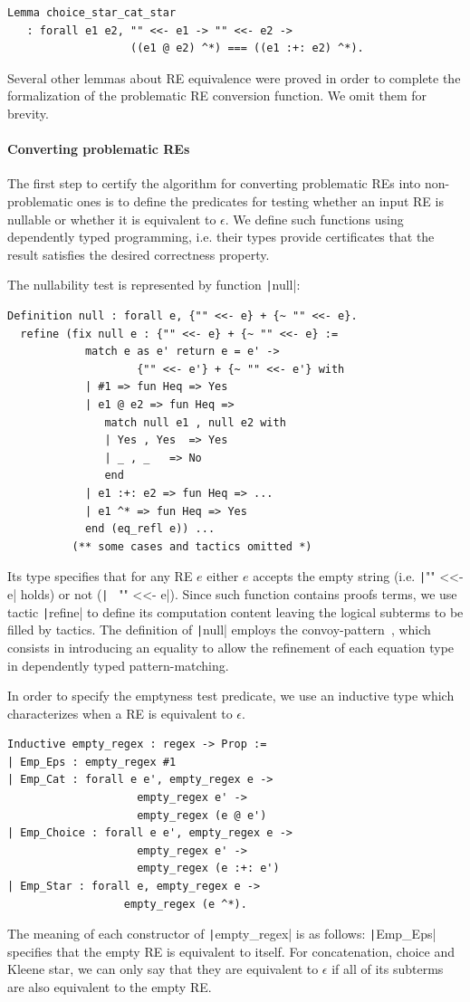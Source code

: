\documentclass[review]{elsarticle}
\newcommand{\coq}[1]{\texttt|#1|}
\theoremstyle{definition}
\begin{document}
\begin{verbatim}
Lemma choice_star_cat_star 
   : forall e1 e2, "" <<- e1 -> "" <<- e2 ->
                   ((e1 @ e2) ^*) === ((e1 :+: e2) ^*). 

\end{verbatim}
Several other lemmas about RE equivalence were proved in order to complete
the formalization of the problematic RE conversion function. We omit them
for brevity.

\paragraph{Converting problematic REs} The first step to certify the algorithm
for converting problematic REs into non-problematic ones is to define the
predicates for testing whether an input RE is nullable or whether it is equivalent to
$\epsilon$. We define such functions using dependently typed programming, i.e.
their types provide certificates that the result satisfies the desired correctness
property.

The nullability test is represented by function \coq{null}:
\begin{verbatim}
Definition null : forall e, {"" <<- e} + {~ "" <<- e}.
  refine (fix null e : {"" <<- e} + {~ "" <<- e} :=
            match e as e' return e = e' -> 
                    {"" <<- e'} + {~ "" <<- e'} with
            | #1 => fun Heq => Yes
            | e1 @ e2 => fun Heq =>
               match null e1 , null e2 with
               | Yes , Yes  => Yes
               | _ , _   => No
               end 
            | e1 :+: e2 => fun Heq => ...
            | e1 ^* => fun Heq => Yes
            end (eq_refl e)) ...
          (** some cases and tactics omitted *)
\end{verbatim}
Its type specifies that for any RE $e$ either $e$ accepts the empty string (i.e.
\coq{"" <<- e} holds) or not (\coq{~ "" <<- e}). Since such function contains
proofs terms, we use tactic \coq{refine} to define its computation content
leaving the logical subterms to be filled by tactics. The definition of
\coq{null} employs the convoy-pattern~\cite{Chlipala13}, which consists in
introducing an equality to allow the refinement of each equation type in
dependently typed pattern-matching.

In order to specify the emptyness test predicate, we use an inductive type
which characterizes when a RE is equivalent to $\epsilon$.
\begin{verbatim}
Inductive empty_regex : regex -> Prop :=
| Emp_Eps : empty_regex #1
| Emp_Cat : forall e e', empty_regex e ->
                    empty_regex e' ->
                    empty_regex (e @ e')
| Emp_Choice : forall e e', empty_regex e ->
                    empty_regex e' ->
                    empty_regex (e :+: e')
| Emp_Star : forall e, empty_regex e ->
                  empty_regex (e ^*).
\end{verbatim}
The meaning of each constructor of \coq{empty_regex} is as follows:
\coq{Emp_Eps} specifies that the empty RE is equivalent to itself.
For concatenation, choice and Kleene star, we can only say that they are
equivalent to $\epsilon$ if all of its subterms are also equivalent
to the empty RE.
\end{document}
